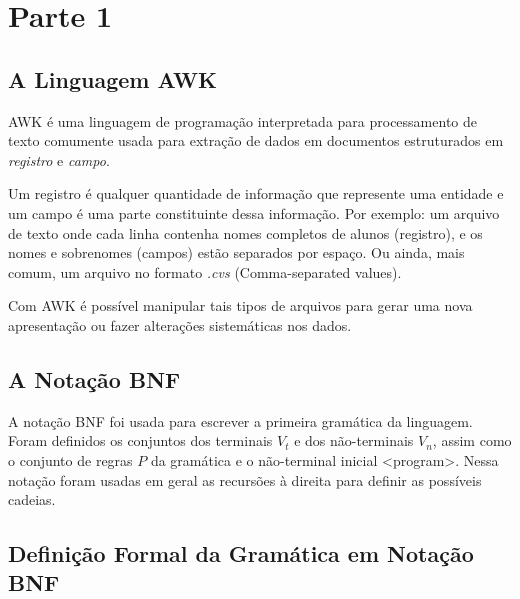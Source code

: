 \section{Parte 1}

\subsection{A Linguagem AWK}

AWK é uma linguagem de programação interpretada para processamento de texto
comumente usada para extração de dados em documentos estruturados em \emph{registro} e \emph{campo}.

Um registro é qualquer quantidade de informação que represente uma entidade
e um campo é uma parte constituinte dessa informação.
Por exemplo: um arquivo de texto onde cada linha contenha nomes completos de alunos (registro), e
os nomes e sobrenomes (campos) estão separados por espaço. Ou ainda, mais comum, um arquivo no
formato \emph{.cvs} (Comma-separated values).

Com AWK é possível manipular tais tipos de arquivos para gerar uma nova apresentação ou fazer
alterações sistemáticas nos dados.

\subsection{A Notação BNF}

A notação BNF foi usada para escrever a primeira gramática da linguagem.
Foram definidos os conjuntos dos terminais $V_t$ e dos não-terminais $V_n$,
assim como o conjunto de regras $P$ da gramática e o não-terminal inicial \textless program\textgreater.
Nessa notação foram usadas em geral as recursões à direita para definir as possíveis cadeias.

\subsection{Definição Formal da Gramática em Notação BNF}


